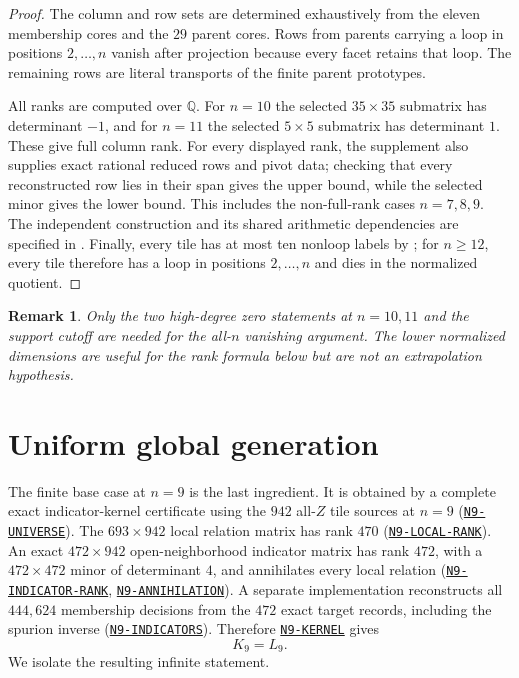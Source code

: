 \documentclass[11pt]{article}
\newtheorem{remark}[theorem]{Remark}
\newcommand{\1}{\mathbf 1}
\newcommand{\cert}[1]{\hyperref[cert:#1]{\texttt{#1}}}
\begin{document}
\begin{proof}
The column and row sets are determined exhaustively from the eleven
membership cores and the $29$ parent cores.  Rows from parents carrying a
loop in positions $2,\dots,n$ vanish after projection because every facet
retains that loop.  The remaining rows are literal transports of the
finite parent prototypes.

All ranks are computed over $\mathbb Q$.  For $n=10$ the selected
$35\times35$ submatrix has determinant $-1$, and for $n=11$
the selected $5\times5$ submatrix has determinant $1$.
These give full column rank.  For every displayed rank, the supplement
also supplies exact rational reduced rows and pivot data; checking that
every reconstructed row lies in their span gives the upper bound, while
the selected minor gives the lower bound.  This includes the non-full-rank
cases $n=7,8,9$.  The independent construction and its shared arithmetic
dependencies are specified in .
Finally, every tile has at most ten nonloop labels by
; for $n\ge12$, every tile therefore has a loop in
positions $2,\dots,n$ and dies in the normalized quotient.
\end{proof}

\begin{remark}
Only the two high-degree zero statements at $n=10,11$ and the support
cutoff are needed for the all-$n$ vanishing argument.  The lower normalized
dimensions are useful for the rank formula below but are not an
extrapolation hypothesis.
\end{remark}

\section{Uniform global generation}
\label{sec:global}

The finite base case at $n=9$ is the last ingredient.  It is obtained by a
complete exact indicator-kernel certificate using the $942$ all-$Z$ tile
sources at $n=9$ (\cert{N9-UNIVERSE}).  The $693\times942$ local relation
matrix has rank $470$ (\cert{N9-LOCAL-RANK}).  An exact
$472\times942$ open-neighborhood indicator matrix has rank $472$, with a
$472\times472$ minor of determinant $4$, and annihilates every local
relation (\cert{N9-INDICATOR-RANK}, \cert{N9-ANNIHILATION}).
A separate implementation reconstructs all $444{,}624$ membership
decisions from the $472$ exact target records, including the spurion
inverse (\cert{N9-INDICATORS}).  Therefore \cert{N9-KERNEL} gives
\begin{equation}\label{eq:basecase}
K_9=L_9.
\end{equation}
We isolate the resulting infinite statement.
\end{document}
